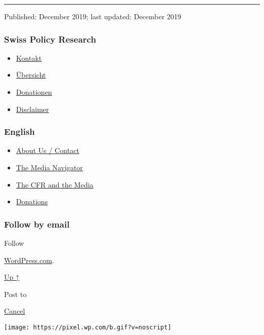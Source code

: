\begin{center}\rule{0.5\linewidth}{\linethickness}\end{center}

Published: December 2019; last updated: December 2019

\hypertarget{swiss-policy-research}{%
\subsubsection{Swiss Policy Research}\label{swiss-policy-research}}

\begin{itemize}
\tightlist
\item
  \href{https://swprs.org/kontakt/}{Kontakt}
\item
  \href{https://swprs.org/uebersicht/}{Übersicht}
\item
  \href{https://swprs.org/donationen/}{Donationen}
\item
  \href{https://swprs.org/disclaimer/}{Disclaimer}
\end{itemize}

\hypertarget{english}{%
\subsubsection{English}\label{english}}

\begin{itemize}
\tightlist
\item
  \href{https://swprs.org/contact/}{About Us / Contact}
\item
  \href{https://swprs.org/media-navigator/}{The Media Navigator}
\item
  \href{https://swprs.org/the-american-empire-and-its-media/}{The CFR
  and the Media}
\item
  \href{https://swprs.org/donations/}{Donations}
\end{itemize}

\hypertarget{follow-by-email}{%
\subsubsection{Follow by email}\label{follow-by-email}}

Follow

\href{https://wordpress.com/?ref=footer_custom_com}{WordPress.com}.

\protect\hyperlink{}{Up ↑}

Post to

\protect\hyperlink{}{Cancel}

\texttt{[image: https://pixel.wp.com/b.gif?v=noscript]}
